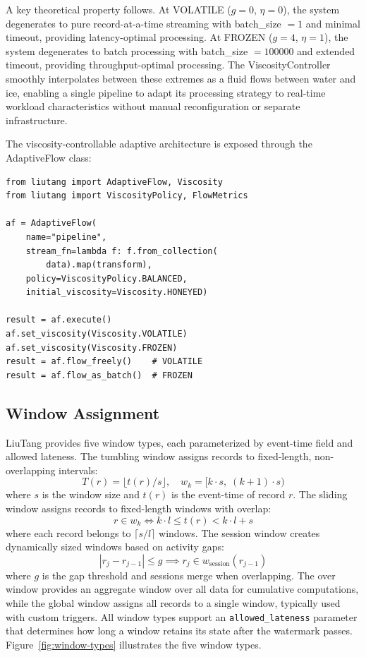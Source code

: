 \documentclass[conference]{IEEEtran}
\begin{document}
A key theoretical property follows. At VOLATILE ($g = 0$, $\eta = 0$), the system degenerates to pure record-at-a-time streaming with batch\_size $= 1$ and minimal timeout, providing latency-optimal processing. At FROZEN ($g = 4$, $\eta = 1$), the system degenerates to batch processing with batch\_size $= 100000$ and extended timeout, providing throughput-optimal processing. The ViscosityController smoothly interpolates between these extremes as a fluid flows between water and ice, enabling a single pipeline to adapt its processing strategy to real-time workload characteristics without manual reconfiguration or separate infrastructure.

The viscosity-controllable adaptive architecture is exposed through the AdaptiveFlow class:

\begin{lstlisting}
from liutang import AdaptiveFlow, Viscosity
from liutang import ViscosityPolicy, FlowMetrics

af = AdaptiveFlow(
    name="pipeline",
    stream_fn=lambda f: f.from_collection(
        data).map(transform),
    policy=ViscosityPolicy.BALANCED,
    initial_viscosity=Viscosity.HONEYED)

result = af.execute()
af.set_viscosity(Viscosity.VOLATILE)
af.set_viscosity(Viscosity.FROZEN)
result = af.flow_freely()    # VOLATILE
result = af.flow_as_batch()  # FROZEN
\end{lstlisting}

\subsection{Window Assignment}

LiuTang provides five window types, each parameterized by event-time field and allowed lateness. The tumbling window assigns records to fixed-length, non-overlapping intervals:
\begin{equation}
T(r) = \lfloor t(r) / s \rfloor, \quad w_k = [k \cdot s,\; (k+1) \cdot s)
\end{equation}
where $s$ is the window size and $t(r)$ is the event-time of record $r$. The sliding window assigns records to fixed-length windows with overlap:
\begin{equation}
r \in w_{k} \iff k \cdot l \leq t(r) < k \cdot l + s
\end{equation}
where each record belongs to $\lceil s/l \rceil$ windows. The session window creates dynamically sized windows based on activity gaps:
\begin{equation}
|r_{j} - r_{j-1}| \leq g \implies r_j \in w_{\text{session}}(r_{j-1})
\end{equation}
where $g$ is the gap threshold and sessions merge when overlapping. The over window provides an aggregate window over all data for cumulative computations, while the global window assigns all records to a single window, typically used with custom triggers. All window types support an \texttt{allowed\_lateness} parameter that determines how long a window retains its state after the watermark passes. Figure~\ref{fig:window-types} illustrates the five window types.
\end{document}

